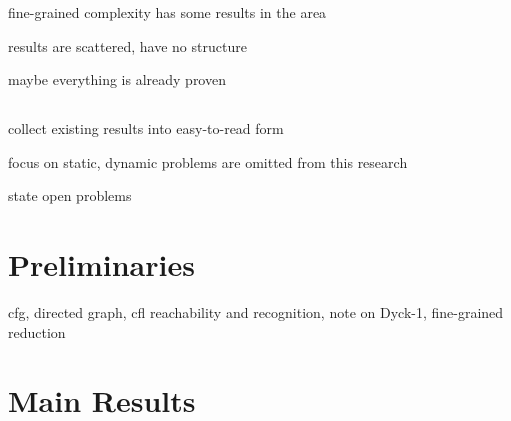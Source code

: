 \documentclass[acmsmall,review,nonacm]{acmart}\settopmatter{printfolios=true,printccs=false,printacmref=false}
\begin{document}
	fine-grained complexity has some results in the area
	
	results are scattered, have no structure
	
	maybe everything is already proven
	
	\subsection{}
	
	collect existing results into easy-to-read form
	
	focus on static, dynamic problems are omitted from this research
	
	state open problems
	
	\section{Preliminaries}
	
	cfg, directed graph, cfl reachability and recognition, note on Dyck-1, fine-grained reduction
	
	\section{Main Results}
	
\end{document}
